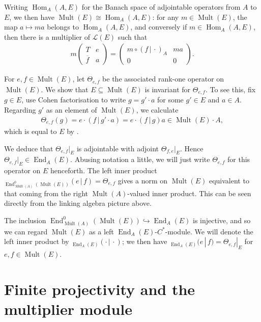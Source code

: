 \documentclass[pdftex]{sigma}
\numberwithin{equation}{section}
\DeclareMathOperator{\End}{End} %
\DeclareMathOperator{\Mult}{Mult} %
\renewcommand{\L}{\mathcal{L}}
\newcommand{\ol}[1]{\overline{#1}} %
\begin{document}
Writing $\operatorname{Hom}_A(A, E)$ for the Banach space of adjointable operators from $A$ to $E$, we then have $\Mult(E) \cong \operatorname{Hom}_A(A, E)$: for any $m \in \Mult(E)$, the map $a \mapsto m a$ belongs to $\operatorname{Hom}_A(A, E)$, and conversely if $m \in \operatorname{Hom}_A(A, E)$, then there is a multiplier of $\L(E)$ such that
\begin{gather*}
m\begin{pmatrix} T & e\\ \ol{f} & a\end{pmatrix} = \begin{pmatrix} m\circ (f \,|\, \cdot)_A & ma \\ 0 & 0\end{pmatrix}.
\end{gather*}

For $e,f \in \Mult(E)$, let $\Theta_{e,f}$ be the associated rank-one operator on $\Mult(E)$. We show that $E \subseteq \Mult(E)$ is invariant for $\Theta_{e,f}$. To see this, f\/ix $g \in E$, use Cohen factorisation to write $g = g' \cdot a$ for some $g' \in E$ and $a \in A$. Regarding $g'$ as an element of $\Mult(E)$, we calculate
\begin{gather}\label{eq:E multE inv}
\Theta_{e,f}(g) = e \cdot (f \,|\, g'\cdot a) = e\cdot (f \,|\, g)a \in \Mult(E)\cdot A,
\end{gather}
which is equal to $E$ by \cite[Remark~3.2(a)]{AB}.

We deduce that $\Theta_{e,f}|_E$ is adjointable with adjoint $\Theta_{f,e}|_E$. Hence $\Theta_{e,f}|_E \in \End_A(E)$. Abusing notation a little, we will just write $\Theta_{e,f}$ for this operator on $E$ henceforth. The left inner product ${}_{\End_{\Mult(A)}^0(\Mult(E))}(e\,|\, f)=\Theta_{e,f}$
gives a norm on $\Mult(E)$ equivalent to that coming from the right $\Mult(A)$-valued inner product. This can be seen directly from the linking algebra picture above.

The inclusion $\End_{\Mult(A)}^0(\Mult(E))\hookrightarrow \End_A(E)$ is injective, and so we can regard $\Mult(E)$ as a left $\End_A(E)$-$C^*$-module. We will denote the left inner product by ${}_{\End_A(E)}(\cdot\,|\,\cdot)$; we then have ${}_{\End_A(E)}(e \,|\, f)
= \Theta_{e,f}|_E$ for $e,f \in \Mult(E)$.

\section{Finite projectivity and the multiplier module}
\end{document}
